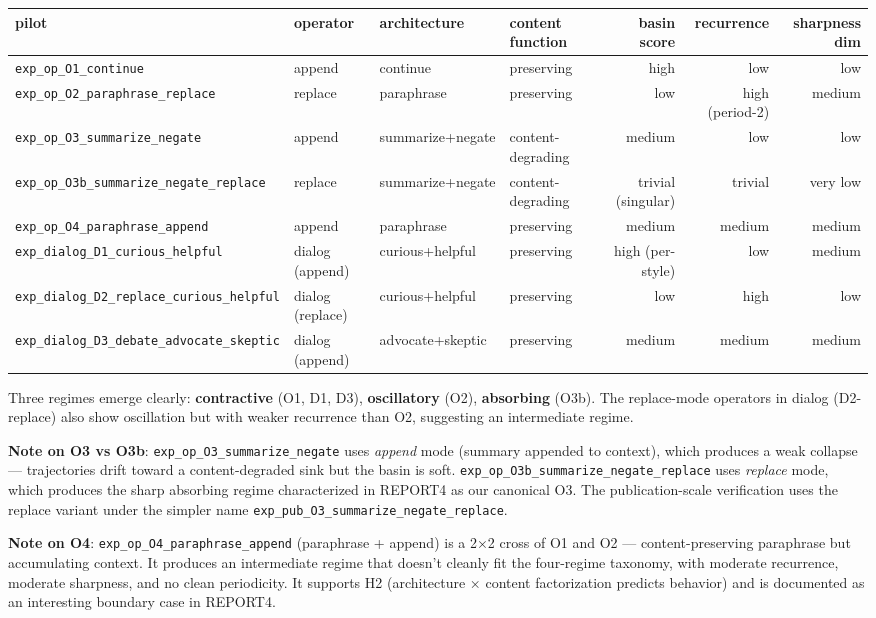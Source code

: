 \documentclass{article}
\theoremstyle{plain}
\theoremstyle{definition}
\begin{document}
\begin{table}[h!]
\centering
\small
\begin{tabular}{llllrrr}
\toprule
pilot & operator & architecture & content function & basin score & recurrence & sharpness dim \\
\midrule
\texttt{exp\_op\_O1\_continue} & append & continue & preserving & high & low & low \\
\texttt{exp\_op\_O2\_paraphrase\_replace} & replace & paraphrase & preserving & low & high (period-2) & medium \\
\texttt{exp\_op\_O3\_summarize\_negate} & append & summarize+negate & content-degrading & medium & low & low \\
\texttt{exp\_op\_O3b\_summarize\_negate\_replace} & replace & summarize+negate & content-degrading & trivial (singular) & trivial & very low \\
\texttt{exp\_op\_O4\_paraphrase\_append} & append & paraphrase & preserving & medium & medium & medium \\
\texttt{exp\_dialog\_D1\_curious\_helpful} & dialog (append) & curious+helpful & preserving & high (per-style) & low & medium \\
\texttt{exp\_dialog\_D2\_replace\_curious\_helpful} & dialog (replace) & curious+helpful & preserving & low & high & low \\
\texttt{exp\_dialog\_D3\_debate\_advocate\_skeptic} & dialog (append) & advocate+skeptic & preserving & medium & medium & medium \\
\bottomrule
\end{tabular}
\end{table}

Three regimes emerge clearly: \textbf{contractive} (O1, D1, D3), \textbf{oscillatory}
(O2), \textbf{absorbing} (O3b). The replace-mode operators in dialog (D2-replace)
also show oscillation but with weaker recurrence than O2, suggesting an
intermediate regime.

\textbf{Note on O3 vs O3b}: \texttt{exp\_op\_O3\_summarize\_negate} uses \textit{append} mode
(summary appended to context), which produces a weak collapse —
trajectories drift toward a content-degraded sink but the basin is
soft. \texttt{exp\_op\_O3b\_summarize\_negate\_replace} uses \textit{replace} mode, which
produces the sharp absorbing regime characterized in REPORT4 as our
canonical O3. The publication-scale verification uses the replace
variant under the simpler name \texttt{exp\_pub\_O3\_summarize\_negate\_replace}.

\textbf{Note on O4}: \texttt{exp\_op\_O4\_paraphrase\_append} (paraphrase + append) is a
2×2 cross of O1 and O2 — content-preserving paraphrase but accumulating
context. It produces an intermediate regime that doesn't cleanly fit the
four-regime taxonomy, with moderate recurrence, moderate sharpness, and
no clean periodicity. It supports H2 (architecture × content
factorization predicts behavior) and is documented as an interesting
boundary case in REPORT4.
\end{document}
